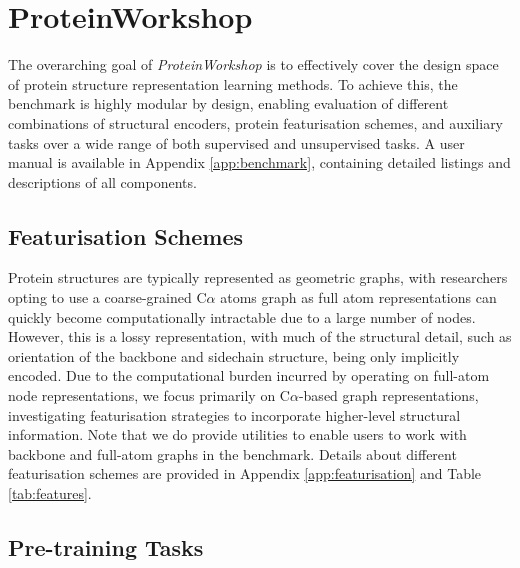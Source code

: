 \section{ProteinWorkshop}
The overarching goal of \emph{ProteinWorkshop} is to effectively cover the design space of protein structure representation learning methods. To achieve this, the benchmark is highly modular by design, enabling evaluation of different combinations of structural encoders, protein featurisation schemes, and auxiliary tasks over a wide range of both supervised and unsupervised tasks.
A user manual is available in Appendix \ref{app:benchmark}, containing detailed listings and descriptions of all components.

\subsection{Featurisation Schemes}
Protein structures are typically represented as geometric graphs, with researchers opting to use a coarse-grained C$\alpha$ atoms graph as full atom representations can quickly become computationally intractable due to a large number of nodes. 
However, this is a lossy representation, with much of the structural detail, such as orientation of the backbone and sidechain structure, being only implicitly encoded.
Due to the computational burden incurred by operating on full-atom node representations, we focus primarily on C$\alpha$-based graph representations, investigating featurisation strategies to incorporate higher-level structural information. 
Note that we do provide utilities to enable users to work with backbone and full-atom graphs in the benchmark.
Details about different featurisation schemes are provided in Appendix \ref{app:featurisation} and Table \ref{tab:features}.

\subsection{Pre-training Tasks}

